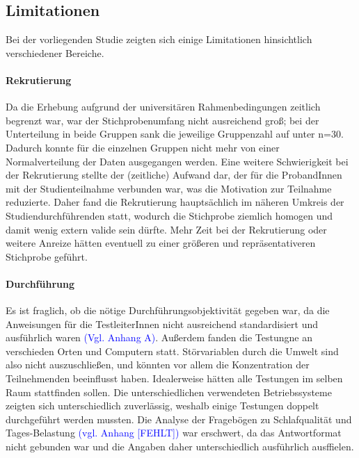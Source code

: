 

\subsection{Limitationen}
Bei der vorliegenden Studie zeigten sich einige Limitationen hinsichtlich verschiedener Bereiche.
\paragraph{Rekrutierung}
Da die Erhebung aufgrund der universitären Rahmenbedingungen zeitlich begrenzt war, war der Stichprobenumfang nicht ausreichend groß; bei der Unterteilung in beide Gruppen sank die jeweilige Gruppenzahl auf unter n=30. Dadurch konnte für die einzelnen Gruppen nicht mehr von einer Normalverteilung der Daten ausgegangen werden. Eine weitere Schwierigkeit bei der Rekrutierung stellte der (zeitliche) Aufwand dar, der für die ProbandInnen mit der Studienteilnahme verbunden war, was die Motivation zur Teilnahme reduzierte. Daher fand die Rekrutierung hauptsächlich im näheren Umkreis der Studiendurchführenden statt, wodurch die Stichprobe ziemlich homogen und damit wenig extern valide sein dürfte. Mehr Zeit bei der Rekrutierung oder weitere Anreize hätten eventuell zu einer größeren und repräsentativeren Stichprobe geführt.

\paragraph{Durchführung}
Es ist fraglich, ob die nötige Durchführungsobjektivität gegeben war, da die Anweisungen für die TestleiterInnen nicht ausreichend standardisiert und ausführlich waren \textcolor{blue}{(Vgl. Anhang A)}. Außerdem fanden die Testungne an verschieden Orten und Computern statt. Störvariablen durch die Umwelt sind also nicht auszuschließen, und könnten vor allem die Konzentration der Teilnehmenden beeinflusst haben. Idealerweise hätten alle Testungen im selben Raum stattfinden sollen. Die unterschiedlichen verwendeten Betriebssysteme zeigten sich unterschiedlich zuverlässig, weshalb einige Testungen doppelt durchgeführt werden mussten.
Die Analyse der Fragebögen zu Schlafqualität und Tages-Belastung \textcolor{blue}{(vgl. Anhang [FEHLT])} war erschwert, da das Antwortformat nicht gebunden war und die Angaben daher unterschiedlich ausführlich ausffielen.

